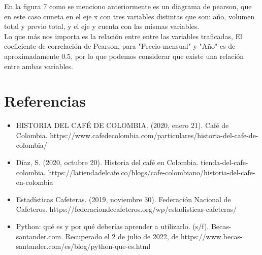 \documentclass[11pt,letterpaper,twocolumn]{article}
\begin{document}
En la figura 7 como se menciono anteriormente es un diagrama de pearson, que en este caso cuneta en el eje x con tres variables distintas que son: año, volumen total y previo total, y el eje y cuenta con las mismas variables.\\
Lo que más nos importa es la relación entre  entre las variables traficadas,
El coeficiente de correlación de Pearson, para "Precio mensual" y "Año" es de aproximadamente 0.5,  por lo que podemos considerar que existe una relación entre ambas variables.

\section{Referencias}
\begin{itemize}
    \item HISTORIA DEL CAFÉ DE COLOMBIA. (2020, enero 21). Café de Colombia. https://www.cafedecolombia.com/particulares/historia-del-cafe-de-colombia/

    \item Díaz, S. (2020, octubre 20). Historia del café en Colombia. tienda-del-cafe-colombia. https://latiendadelcafe.co/blogs/cafe-colombiano/historia-del-cafe-en-colombia

    \item Estadísticas Cafeteras. (2019, noviembre 30). Federación Nacional de Cafeteros. https://federaciondecafeteros.org/wp/estadisticas-cafeteras/

    \item Python: qué es y por qué deberías aprender a utilizarlo. (s/f). Becas-santander.com. Recuperado el 2 de julio de 2022, de https://www.becas-santander.com/es/blog/python-que-es.html
\end{itemize}
  
\end{document}
